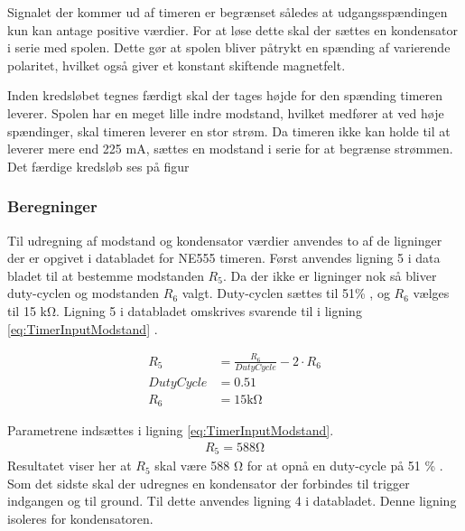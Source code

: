 Signalet der kommer ud af timeren er begrænset således at udgangsspændingen kun kan antage positive værdier.
For at løse dette skal der sættes en kondensator i serie med spolen.
Dette gør at spolen bliver påtrykt en spænding af varierende polaritet, hvilket også giver et konstant skiftende magnetfelt.

Inden kredsløbet tegnes færdigt skal der tages højde for den spænding timeren leverer. 
Spolen har en meget lille indre modstand, hvilket medfører at ved høje spændinger, skal timeren leverer en stor strøm. 
Da timeren ikke kan holde til at leverer mere end 225 \si{\milli\ampere}, sættes en modstand i serie for at begrænse strømmen. 
Det færdige kredsløb ses på figur 

\subsubsection{Beregninger}
Til udregning af modstand og kondensator værdier anvendes to af de ligninger der er opgivet i databladet for NE555 timeren. 
Først anvendes ligning 5 i data bladet til at bestemme modstanden $R_5$. 
Da der ikke er ligninger nok så bliver duty-cyclen og modstanden $R_6$ valgt. 
Duty-cyclen sættes til 51\%  , og $R_6$ vælges til 15 \si{\kilo\ohm}. 
Ligning 5 i databladet omskrives svarende til i ligning \ref{eq:TimerInputModstand} .

\begin{align}
R_5 & = \frac{R_6}{DutyCycle} - 2 \cdot R_6 \label{eq:TimerInputModstand} \\
DutyCycle & = 0.51 \nonumber \\
R_6 & = 15 \si{\kilo \ohm} \nonumber
\end{align}

Parametrene indsættes i ligning \ref{eq:TimerInputModstand}.
\begin{align}
R_5 = 588 \si{\ohm} \label{eq:InputBeregnet}
\end{align}
Resultatet viser her at $R_5$ skal være 588 \si{\ohm}  for at opnå en duty-cycle på 51 \% .
Som det sidste skal der udregnes en kondensator der forbindes til trigger indgangen og til ground. 
Til dette anvendes ligning 4 i databladet. Denne ligning isoleres for kondensatoren.


